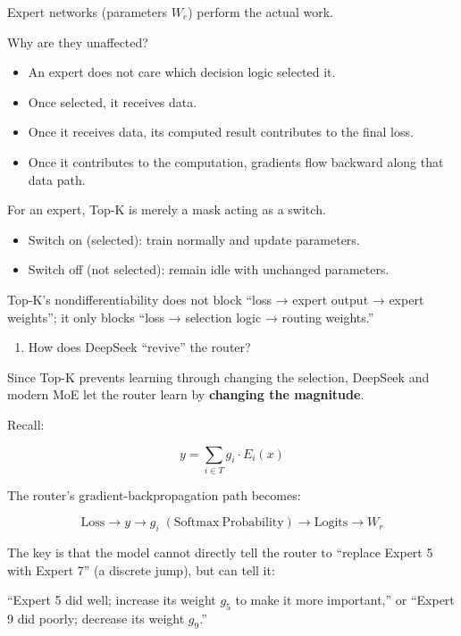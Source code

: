 Expert networks (parameters \(W_e\)) perform the actual work.

Why are they unaffected?

\begin{itemize}
\tightlist
\item
  An expert does not care which decision logic selected it.
\item
  Once selected, it receives data.
\item
  Once it receives data, its computed result contributes to the final loss.
\item
  Once it contributes to the computation, gradients flow backward along that data path.
\end{itemize}

For an expert, Top-K is merely a mask acting as a switch.

\begin{itemize}
\tightlist
\item
  Switch on (selected): train normally and update parameters.
\item
  Switch off (not selected): remain idle with unchanged parameters.
\end{itemize}

Top-K's nondifferentiability does not block ``loss → expert output → expert weights''; it only blocks ``loss → selection logic → routing weights.''

\begin{enumerate}
\def\labelenumi{\arabic{enumi}.}
\setcounter{enumi}{2}
\tightlist
\item
  How does DeepSeek ``revive'' the router?
\end{enumerate}

Since Top-K prevents learning through changing the selection, DeepSeek and modern MoE let the router learn by \textbf{changing the magnitude}.

Recall:

\[
y=\sum_{i\in T}g_i\cdot E_i(x)
\]

The router's gradient-backpropagation path becomes:

\[
\mathrm{Loss}\rightarrow y\rightarrow g_i\;(\mathrm{Softmax\ Probability})\rightarrow \mathrm{Logits}\rightarrow W_r
\]

The key is that the model cannot directly tell the router to ``replace Expert 5 with Expert 7'' (a discrete jump), but can tell it:

``Expert 5 did well; increase its weight \(g_5\) to make it more important,'' or ``Expert 9 did poorly; decrease its weight \(g_9\).''

